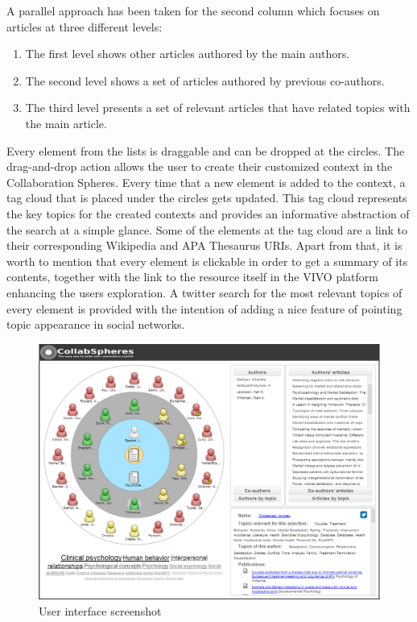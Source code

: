A parallel approach has been taken for the second column which focuses on articles at three different levels:
\begin{enumerate}
  \item The first level shows other articles authored by the main authors.
  \item The second level shows  a set of articles authored by previous co-authors.
  \item The third level presents a set of relevant articles that have related topics with the main article.
\end{enumerate}  
Every element from the lists is draggable and can be dropped at the circles. The drag-and-drop action allows the user to create their customized context in the Collaboration Spheres.
Every time that a new element is added to the context, a tag cloud that is placed under the circles gets updated. This tag cloud represents the key topics for the created contexts and provides an informative abstraction of the search at a simple glance. Some of the elements at the tag cloud are a link to their corresponding Wikipedia and APA Thesaurus URIs.
Apart from that, it is worth to mention that every element is clickable in order to get a summary of its contents, together with the link to the resource itself in the VIVO platform enhancing the users exploration. A twitter search for the most relevant topics of every element is provided with the intention of adding a nice feature of pointing topic appearance in social networks.\\
\begin{figure}[!hbt]
\centering
\includegraphics[scale=0.3]{img/CollabAPA.png}
\caption{User interface screenshot}
\label{fig:screenshot}
\end{figure}

